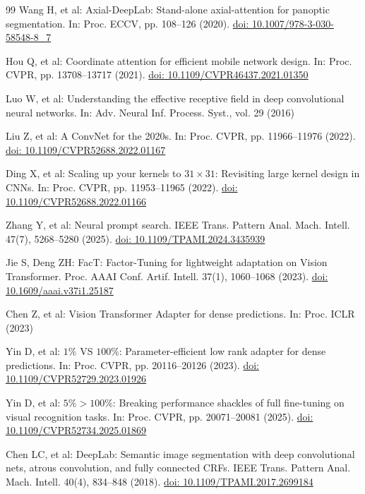 \documentclass[pdflatex,sn-mathphys-num]{sn-jnl}
\theoremstyle{thmstyleone}
\theoremstyle{thmstyletwo}
\theoremstyle{thmstylethree}
\begin{document}
\begin{thebibliography}{99}
Wang H, et al:
Axial-DeepLab: Stand-alone axial-attention for panoptic segmentation.
In: Proc. ECCV, pp. 108--126 (2020).
\href{https://doi.org/10.1007/978-3-030-58548-8_7}{doi: 10.1007/978-3-030-58548-8\_7}

Hou Q, et al:
Coordinate attention for efficient mobile network design.
In: Proc. CVPR, pp. 13708--13717 (2021).
\href{https://doi.org/10.1109/CVPR46437.2021.01350}{doi: 10.1109/CVPR46437.2021.01350}

Luo W, et al:
Understanding the effective receptive field in deep convolutional neural networks.
In: Adv. Neural Inf. Process. Syst., vol. 29 (2016)

Liu Z, et al:
A ConvNet for the 2020s.
In: Proc. CVPR, pp. 11966--11976 (2022).
\href{https://doi.org/10.1109/CVPR52688.2022.01167}{doi: 10.1109/CVPR52688.2022.01167}

Ding X, et al:
Scaling up your kernels to $31\times31$: Revisiting large kernel design in CNNs.
In: Proc. CVPR, pp. 11953--11965 (2022).
\href{https://doi.org/10.1109/CVPR52688.2022.01166}{doi: 10.1109/CVPR52688.2022.01166}

Zhang Y, et al:
Neural prompt search.
IEEE Trans. Pattern Anal. Mach. Intell. 47(7), 5268--5280 (2025).
\href{https://doi.org/10.1109/TPAMI.2024.3435939}{doi: 10.1109/TPAMI.2024.3435939}

Jie S, Deng ZH:
FacT: Factor-Tuning for lightweight adaptation on Vision Transformer.
Proc. AAAI Conf. Artif. Intell. 37(1), 1060--1068 (2023).
\href{https://doi.org/10.1609/aaai.v37i1.25187}{doi: 10.1609/aaai.v37i1.25187}

Chen Z, et al:
Vision Transformer Adapter for dense predictions.
In: Proc. ICLR (2023)

Yin D, et al:
$1\%$ VS $100\%$: Parameter-efficient low rank adapter for dense predictions.
In: Proc. CVPR, pp. 20116--20126 (2023).
\href{https://doi.org/10.1109/CVPR52729.2023.01926}{doi: 10.1109/CVPR52729.2023.01926}

Yin D, et al:
$5\%>100\%$: Breaking performance shackles of full fine-tuning on visual recognition tasks.
In: Proc. CVPR, pp. 20071--20081 (2025).
\href{https://doi.org/10.1109/CVPR52734.2025.01869}{doi: 10.1109/CVPR52734.2025.01869}

Chen LC, et al:
DeepLab: Semantic image segmentation with deep convolutional nets, atrous convolution, and fully connected CRFs.
IEEE Trans. Pattern Anal. Mach. Intell. 40(4), 834--848 (2018).
\href{https://doi.org/10.1109/TPAMI.2017.2699184}{doi: 10.1109/TPAMI.2017.2699184}


\end{thebibliography}
\end{document}
